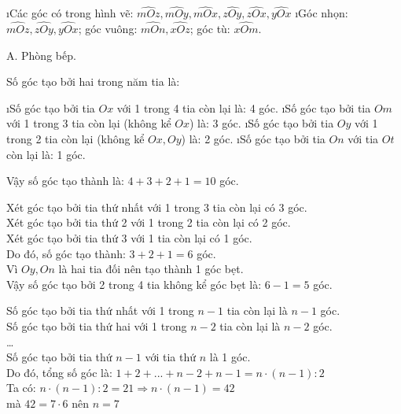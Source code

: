 \begin{Answer}{44}
		\begin{enumerate}[a),leftmargin=*]
			\i Các góc có trong hình vẽ: $\widehat{mOz},\widehat{mOy},\widehat{mOx},\widehat{zOy},\widehat{zOx},\widehat{yOx}$
			\i Góc nhọn: $\widehat{mOz},\widehat{zOy},\widehat{yOx}$; góc vuông: $\widehat{mOn},\widehat{xOz}$; góc tù: $\widehat{xOm}$.
		\end{enumerate}
	
\end{Answer}
\begin{Answer}{45}
		A. Phòng bếp.
	
\end{Answer}
\begin{Answer}{46}
		Số góc tạo bởi hai trong năm tia là:
		\begin{enumerate}[--,leftmargin=*]
			\i Số góc tạo bởi tia $Ox$ với 1 trong 4 tia còn lại là: 4 góc.
			\i Số góc tạo bởi tia $Om$ với 1 trong 3 tia còn lại (không kể $Ox$) là: 3 góc.
			\i Số góc tạo bởi tia $Oy$ với 1 trong 2 tia còn lại (không kể $Ox,Oy$) là: 2 góc.
			\i Số góc tạo bởi tia $On$ với tia $Ot$ còn lại là: 1 góc.
		\end{enumerate}
		Vậy số góc tạo thành là: $4+3+2+1=10$ góc.
	
\end{Answer}
\begin{Answer}{47}
		Xét góc tạo bởi tia thứ nhất với 1 trong 3 tia còn lại có 3 góc.\\
		Xét góc tạo bởi tia thứ 2 với 1 trong 2 tia còn lại có 2 góc.\\
		Xét góc tạo bởi tia thứ 3 với 1 tia còn lại có 1 góc.\\
		Do đó, số góc tạo thành: $3+2+1=6$ góc.\\
		Vì $Oy,On$ là hai tia đối nên tạo thành 1 góc bẹt.\\
		Vậy số góc tạo bởi 2 trong 4 tia không kể góc bẹt là: $6-1=5$ góc.
	
\end{Answer}
\begin{Answer}{48}
		Số góc tạo bởi tia thứ nhất với 1 trong $n-1$ tia còn lại là $n-1$ góc.\\
		Số góc tạo bởi tia thứ hai với 1 trong $n-2$ tia còn lại là $n-2$ góc.\\
		\ldots \\
		Số góc tạo bởi tia thứ $n-1$ với tia thứ $n$ là 1 góc.\\
		Do đó, tổng số góc là: $1+2+...+n-2+n-1=n\cdot\left( n-1 \right):2$\\
		Ta có: $n\cdot\left( n-1 \right):2=21\Rightarrow n\cdot\left( n-1 \right)=42$\\
		mà $42=7\cdot6$ nên $n=7$
	
\end{Answer}
